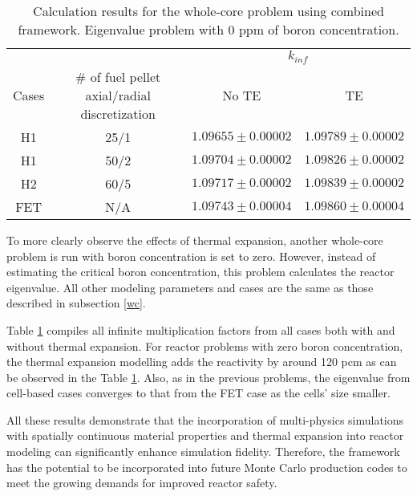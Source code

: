 \begin{table}
    \centering
    \caption[Eigenvalue results for the whole-core problem using combined framework.]{Calculation results for the whole-core problem using combined framework. Eigenvalue problem with 0 ppm of boron concentration.}
    \label{tab432} 
    \begin{tabular}{| c | c | c | c | }
    \hline 
       &   & \multicolumn{2}{c|}{$k_{inf}$}       \\
    \cline{3-4}
     Cases & \# of fuel pellet axial/radial discretization & No TE & TE \\
     \hline
     H1     & 25/1  & $1.09655\pm0.00002$ & $1.09789\pm0.00002$      \\ \hline
     H1     & 50/2  & $1.09704\pm0.00002$ & $1.09826\pm0.00002$      \\ \hline
     H2     & 60/5  & $1.09717\pm0.00002$ & $1.09839\pm0.00002$      \\ \hline
     FET    & N/A   & $1.09743\pm0.00004$ & $1.09860\pm0.00004$      \\ \hline
    \end{tabular}
\end{table}

To more clearly observe the effects of thermal expansion, another whole-core problem is run with boron concentration is set to zero. However, instead of estimating the critical boron concentration, this problem calculates the reactor eigenvalue. All other modeling parameters and cases are the same as those described in subsection \ref{wc}.

Table \ref{tab432} compiles all infinite multiplication factors from all cases both with and without thermal expansion. For reactor problems with zero boron concentration, the thermal expansion modelling adds the reactivity by around 120 pcm as can be observed in the Table \ref{tab432}. Also, as in the previous problems, the eigenvalue from cell-based cases converges to that from the FET case as the cells' size smaller.

All these results demonstrate that the incorporation of multi-physics simulations with spatially continuous material properties and thermal expansion into reactor modeling can significantly enhance simulation fidelity. Therefore, the framework has the potential to be incorporated into future Monte Carlo production codes to meet the growing demands for improved reactor safety.